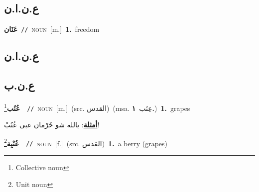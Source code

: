 \documentclass[10pt,a4paper,twoside]{article} %
\begin{document}
\begin{multicols}{2}
\vspace{-3mm}
\subsection*{\color{blue}\foreignlanguage{arabic}{ع.ن.ا.ن}\color{blue}{}} 

{\setlength\topsep{0pt}\textbf{\foreignlanguage{arabic}{عَنَان}}\ {\color{gray}\texttt{//}\color{black}}\ \textsc{noun}\ [m.]\ \textbf{1.}~freedom\ } \vspace{2mm}

\vspace{-3mm}
\subsection*{\color{blue}\foreignlanguage{arabic}{ع.ن.ا.ن}\color{blue}{ (ntws)}} 

\vspace{-3mm}
\subsection*{\color{blue}\foreignlanguage{arabic}{ع.ن.ب}\color{blue}{}} 

{\setlength\topsep{0pt}\textbf{\foreignlanguage{arabic}{عُنُب}}\footnote{Collective noun}\ \ {\color{gray}\texttt{//}\color{black}}\ \textsc{noun}\ [m.]\ (src. \color{gray}\foreignlanguage{arabic}{القدس}\color{black})\ \color{gray}(msa. \foreignlanguage{arabic}{عِنَب}~\foreignlanguage{arabic}{\textbf{١.}})\color{black}\ \textbf{1.}~grapes\  \begin{flushright}\color{gray}\foreignlanguage{arabic}{\textbf{\underline{\foreignlanguage{arabic}{أمثلة}}}: يالله شو خَرْمان عبى عُنُبْ!}\end{flushright}\color{black}} \vspace{2mm}

{\setlength\topsep{0pt}\textbf{\foreignlanguage{arabic}{عُنْبِة}}\footnote{Unit noun}\ \ {\color{gray}\texttt{//}\color{black}}\ \textsc{noun}\ [f.]\ (src. \color{gray}\foreignlanguage{arabic}{القدس}\color{black})\ \textbf{1.}~a berry (grapes)\ } \vspace{2mm}


\end{multicols}
\end{document}
